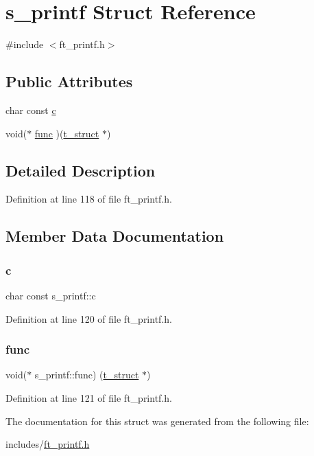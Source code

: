 \hypertarget{structs__printf}{}\section{s\+\_\+printf Struct Reference}
\label{structs__printf}


{\ttfamily \#include $<$ft\+\_\+printf.\+h$>$}

\subsection*{Public Attributes}
\begin{DoxyCompactItemize}
\item 
char const \hyperlink{structs__printf_ae7dcd8d1613551eff1ee151fbd989d33}{c}
\item 
void($\ast$ \hyperlink{structs__printf_a22ec20d088af8188f34f5ea7cbde7423}{func} )(\hyperlink{ft__printf_8h_a79766236fad20faabc4a98324a764381}{t\+\_\+struct} $\ast$)
\end{DoxyCompactItemize}


\subsection{Detailed Description}


Definition at line 118 of file ft\+\_\+printf.\+h.



\subsection{Member Data Documentation}
\mbox{\label{structs__printf_ae7dcd8d1613551eff1ee151fbd989d33}} 
\subsubsection{\texorpdfstring{c}{c}}
{\footnotesize\ttfamily char const s\+\_\+printf\+::c}



Definition at line 120 of file ft\+\_\+printf.\+h.

\mbox{\label{structs__printf_a22ec20d088af8188f34f5ea7cbde7423}} 
\subsubsection{\texorpdfstring{func}{func}}
{\footnotesize\ttfamily void($\ast$ s\+\_\+printf\+::func) (\hyperlink{ft__printf_8h_a79766236fad20faabc4a98324a764381}{t\+\_\+struct} $\ast$)}



Definition at line 121 of file ft\+\_\+printf.\+h.



The documentation for this struct was generated from the following file\+:\begin{DoxyCompactItemize}
\item 
includes/\hyperlink{ft__printf_8h}{ft\+\_\+printf.\+h}\end{DoxyCompactItemize}
